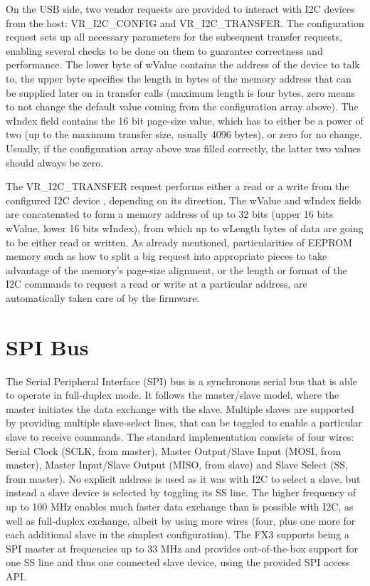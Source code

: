 \documentclass[a4paper,12pt]{report}
\begin{document}
On the USB side, two vendor requests are provided to interact with I2C devices from the host: VR\_I2C\_CONFIG and VR\_I2C\_TRANSFER.
The configuration request sets up all necessary parameters for the subsequent transfer requests, enabling several checks to be done on them to guarantee correctness and performance. The lower byte of wValue contains the address of the device to talk to, the upper byte specifies the  length in bytes of the memory address that can be supplied later on in transfer calls (maximum length is four bytes, zero means to not change the default value coming from the configuration array above). The wIndex field contains the 16 bit page-size value, which has to either be a power of two (up to the maximum transfer size, usually 4096 bytes), or zero for no change. Usually, if the configuration array above was filled correctly, the latter two values should always be zero.

The VR\_I2C\_TRANSFER request performs either a read or a write from the configured I2C device \cite{RM-MPU-6000A}, depending on its direction. The wValue and wIndex fields are concatenated to form a memory address of up to 32 bits (upper 16 bits wValue, lower 16 bits wIndex), from which up to wLength bytes of data are going to be either read or written. As already mentioned, particularities of EEPROM memory such as how to split a big request into appropriate pieces to take advantage of the memory's page-size alignment, or the length or format of the I2C commands to request a read or write at a particular address, are automatically taken care of by the firmware.

\section{SPI Bus} \label{sec:spi_bus}

The Serial Peripheral Interface (SPI) bus is a synchronous serial bus that is able to operate in full-duplex mode. It follows the master/slave model, where the master initiates the data exchange with the slave. Multiple slaves are supported by providing multiple slave-select lines, that can be toggled to enable a particular slave to receive commands. The standard implementation consists of four wires: Serial Clock (SCLK, from master), Master Output/Slave Input (MOSI, from master), Master Input/Slave Output (MISO, from slave) and Slave Select (SS, from master). No explicit address is used as it was with I2C to select a slave, but instead a slave device is selected by toggling its SS line. The higher frequency of up to 100 MHz enables much faster data exchange than is possible with I2C, as well as full-duplex exchange, albeit by using more wires (four, plus one more for each additional slave in the simplest configuration). The FX3 supports being a SPI master at frequencies up to 33 MHz
  and provides out-of-the-box support for one SS line and thus one connected slave device, using the provided SPI access API.
\end{document}
